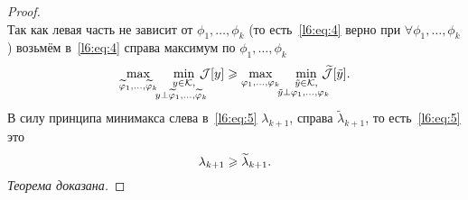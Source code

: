 \begin{proof}
\begin{equation}
	\end{equation}
	Так как левая часть не зависит от $\phi_1,\ldots,\phi_k$ (то есть~\eqref{l6:eq:4} верно при $\forall\phi_1,\ldots,\phi_k$) возьмём в~\eqref{l6:eq:4} справа максимум по $\phi_1,\ldots,\phi_k$
	\begin{equation}
		\label{l6:eq:5}
		\hfill\max\limits_{\widetilde{\phi}_1,\ldots,\widetilde{\phi}_k}\quad\min\limits_{\substack{y\in\K,\\\lefteqn{\scriptstyle \hspace*{-0.8cm}y\perp\widetilde{\phi}_1,\ldots,\widetilde{\phi}_k}}}\,\J[y]\geqslant\max\limits_{{\phi}_1,\ldots,{\phi}_k}\quad\min\limits_{\substack{\tilde{y}\in\K,\\\lefteqn{\scriptstyle \hspace*{-0.8cm}\tilde{y}\perp\phi_1,\ldots,\phi_{k}}}}\,\widetilde{\J}[\tilde{y}].\hfill
	\end{equation}
	В силу принципа минимакса слева в~\eqref{l6:eq:5} $\lambda_{k+1}$, справа $\widetilde{\lambda}_{k+1}$, то есть~\eqref{l6:eq:5} это 
	\begin{equation}
		\label{l6:eq:6}
		\hfill\lambda_{k+1}\geqslant\widetilde{\lambda}_{k+1}.\hfill
	\end{equation}
	\emph{Теорема доказана.}
\end{proof}

